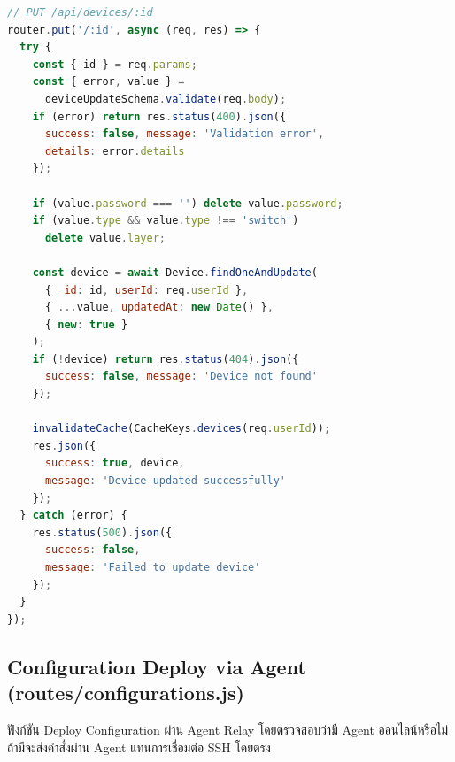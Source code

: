 \begin{lstlisting}[language=JavaScript, caption={routes/devices.js -- Device Validation Schema และ CRUD}]
// PUT /api/devices/:id
router.put('/:id', async (req, res) => {
  try {
    const { id } = req.params;
    const { error, value } =
      deviceUpdateSchema.validate(req.body);
    if (error) return res.status(400).json({
      success: false, message: 'Validation error',
      details: error.details
    });

    if (value.password === '') delete value.password;
    if (value.type && value.type !== 'switch')
      delete value.layer;

    const device = await Device.findOneAndUpdate(
      { _id: id, userId: req.userId },
      { ...value, updatedAt: new Date() },
      { new: true }
    );
    if (!device) return res.status(404).json({
      success: false, message: 'Device not found'
    });

    invalidateCache(CacheKeys.devices(req.userId));
    res.json({
      success: true, device,
      message: 'Device updated successfully'
    });
  } catch (error) {
    res.status(500).json({
      success: false,
      message: 'Failed to update device'
    });
  }
});
\end{lstlisting}

\subsection{Configuration Deploy via Agent (routes/configurations.js)}
\hspace*{1.3em}
ฟังก์ชัน Deploy Configuration ผ่าน Agent Relay โดยตรวจสอบว่ามี Agent ออนไลน์หรือไม่ ถ้ามีจะส่งคำสั่งผ่าน Agent แทนการเชื่อมต่อ SSH โดยตรง

